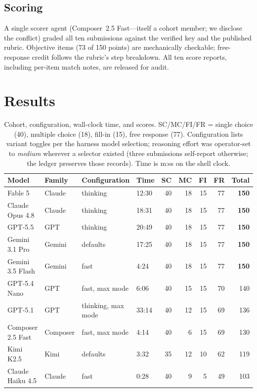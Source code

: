 \documentclass[11pt]{article}
\theoremstyle{plain}
\begin{document}
\subsection{Scoring}

A single scorer agent (Composer~2.5 Fast---itself a cohort member; we
disclose the conflict) graded all ten submissions against the verified key
and the published rubric. Objective items (73 of 150 points) are
mechanically checkable; free-response credit follows the rubric's step
breakdown. All ten score reports, including per-item match notes, are
released for audit.

\section{Results}
\label{sec:results}

\begin{table}[t]
  \centering\small
  \setlength{\tabcolsep}{4.6pt}
  \caption{Cohort, configuration, wall-clock time, and scores.
    SC/MC/FI/FR = single choice (40), multiple choice (18), fill-in (15),
    free response (77). Configuration lists variant toggles per the
    harness model selection; reasoning effort was operator-set to
    \emph{medium} wherever a selector existed (three submissions
    self-report otherwise; the ledger preserves those records). Time is
    m:ss on the shell clock.}
  \label{tab:results}
  \begin{tabular}{@{}llllrrrrr@{}}
    \toprule
    Model & Family & Configuration & Time & SC & MC & FI & FR & Total \\
    \midrule
    Fable 5           & Claude   & thinking           & 12:30 & 40 & 18 & 15 & 77 & \textbf{150} \\
    Claude Opus 4.8   & Claude   & thinking           & 18:31 & 40 & 18 & 15 & 77 & \textbf{150} \\
    GPT-5.5           & GPT      & thinking           & 20:49 & 40 & 18 & 15 & 77 & \textbf{150} \\
    Gemini 3.1 Pro    & Gemini   & defaults           & 17:25 & 40 & 18 & 15 & 77 & \textbf{150} \\
    Gemini 3.5 Flash  & Gemini   & fast               &  4:24 & 40 & 18 & 15 & 77 & \textbf{150} \\
    \addlinespace
    GPT-5.4 Nano      & GPT      & fast, max mode     &  6:06 & 40 & 15 & 15 & 70 & 140 \\
    GPT-5.1           & GPT      & thinking, max mode & 33:14 & 40 & 12 & 15 & 69 & 136 \\
    Composer 2.5 Fast & Composer & fast, max mode     &  4:14 & 40 &  6 & 15 & 69 & 130 \\
    Kimi K2.5         & Kimi     & defaults           &  3:32 & 35 & 12 & 10 & 62 & 119 \\
    Claude Haiku 4.5  & Claude   & fast               &  0:28 & 40 &  9 &  5 & 49 & 103 \\
    \bottomrule
  \end{tabular}
\end{table}
\end{document}
